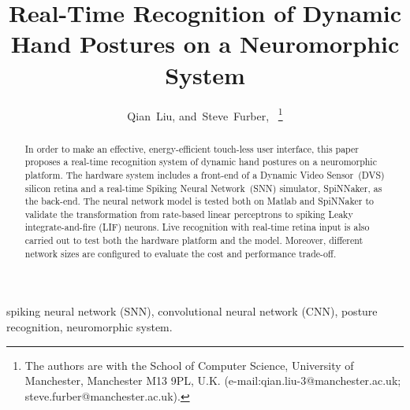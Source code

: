 \documentclass[journal]{journal}
\begin{document}
\title{Real-Time Recognition of Dynamic Hand Postures on a Neuromorphic System}
\author{
Qian~Liu, 
and~Steve~Furber,~
\thanks{
The authors are with the School of Computer Science, University of Manchester, Manchester M13 9PL, U.K. 
(e-mail:qian.liu-3@manchester.ac.uk; steve.furber@manchester.ac.uk).}
}%

\maketitle
\thispagestyle{empty}

\begin{abstract}
In order to make an effective, energy-efficient touch-less user interface, this paper proposes a real-time recognition system of dynamic hand postures on a neuromorphic platform.
The hardware system includes a front-end of a Dynamic Video Sensor~(DVS) silicon retina and a real-time Spiking Neural Network~(SNN) simulator, SpiNNaker, as the back-end.
The neural network model is tested both on Matlab and SpiNNaker to validate the transformation from rate-based linear perceptrons to spiking Leaky integrate-and-fire (LIF) neurons.
Live recognition with real-time retina input is also carried out to test both the hardware platform and the model.
Moreover, different network sizes are configured to evaluate the cost and performance trade-off.

\end{abstract}

\begin{IEEEkeywords}
spiking neural network (SNN), convolutional neural network (CNN), posture recognition, neuromorphic system.
\end{IEEEkeywords}
\end{document}
